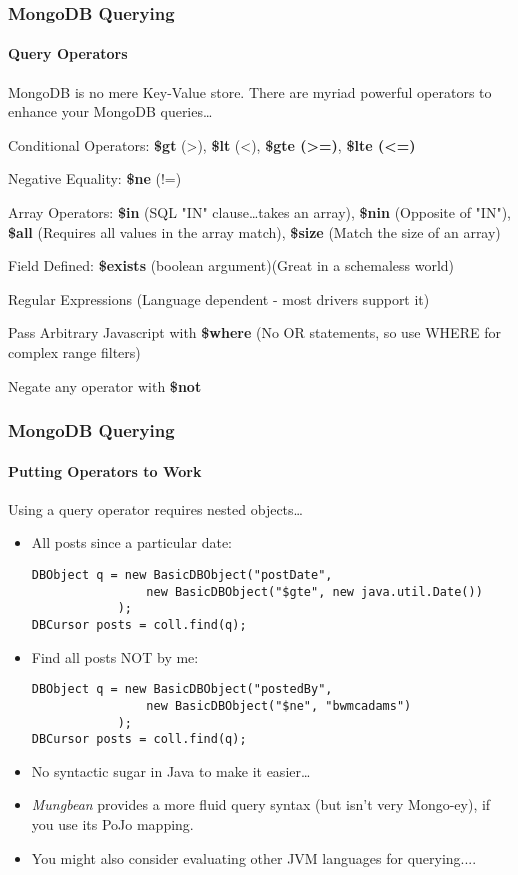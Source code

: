 \documentclass{beamer}
\begin{document}
\begin{frame}
\frametitle{MongoDB Querying}
\framesubtitle{Query Operators}
     MongoDB is no mere Key-Value store. There are myriad powerful operators to enhance your MongoDB queries\ldots
    \begin{itemize}{\small
        \item Conditional Operators: {\bf \$gt} (>), {\bf \$lt} (<), {\bf \$gte (>=)},  {\bf \$lte (<=)}
        \item Negative Equality: {\bf \$ne} (!=) 
        \item Array Operators: {\bf \$in} (SQL "IN" clause\ldots takes an array), {\bf \$nin} (Opposite of "IN"), {\bf \$all} (Requires all values in the array match), {\bf \$size} (Match the size of an array)
        \item Field Defined: {\bf \$exists} (boolean argument)(Great in a schemaless world)
        \item Regular Expressions (Language dependent - most drivers support it)
        \item Pass Arbitrary Javascript with {\bf \$where} (No OR statements, so use WHERE for complex range filters)
        \item Negate any operator with {\bf \$not}
        }
    \end{itemize}
\end{frame}

\begin{frame}[fragile]
\frametitle{MongoDB Querying}
\framesubtitle{Putting Operators to Work}
    Using a query operator requires nested objects\ldots
    \begin{itemize}
        \item<2-> All posts since a particular date:\\ \begin{lstlisting}
DBObject q = new BasicDBObject("postDate", 
                new BasicDBObject("$gte", new java.util.Date())
            ); 
DBCursor posts = coll.find(q);
\end{lstlisting}
        \item<3-> Find all posts NOT by me:\\ \begin{lstlisting}
DBObject q = new BasicDBObject("postedBy", 
                new BasicDBObject("$ne", "bwmcadams")
            );
DBCursor posts = coll.find(q);
\end{lstlisting}
        \item<4-> No syntactic sugar in Java to make it easier\ldots
        \item<5-> {\em Mungbean} provides a more fluid query syntax (but isn't very Mongo-ey), if you use its PoJo mapping.
        \item<6-> You might also consider evaluating other JVM languages for querying....

    \end{itemize}
\end{frame}
\end{document}
